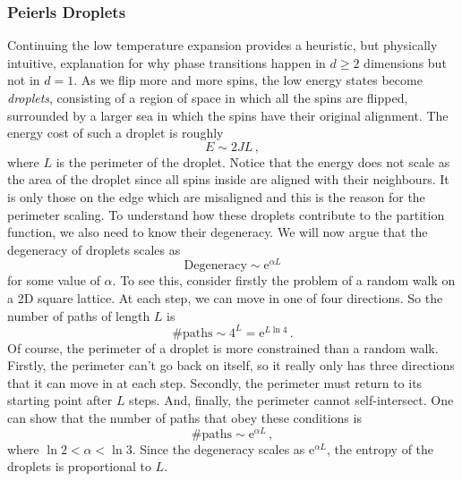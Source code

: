 \documentclass{article}
\theoremstyle{plain}\theoremheaderfont{\normalfont\bfseries}\theorembodyfont{\rmfamily}\theoremseparator{.}\newtheorem*{thm}{Theorem}\newtheorem*{law}{Law}\newtheorem*{pos}{Postulate}
\numberwithin{equation}{section}
\newcommand{\ee}{\mathrm{e}}
\begin{document}
    \subsubsection*{Peierls Droplets}
    Continuing the low temperature expansion provides a heuristic, but physically intuitive, explanation for why phase transitions happen in \(d\ge 2\) dimensions but not in \(d=1\). As we flip more and more spins, the low energy states become \textit{droplets}, consisting of a region of space in which all the spins are flipped, surrounded by a larger sea in which the spins have their original alignment. The energy cost of such a droplet is roughly
    \begin{equation}
        E\sim 2JL\,,
    \end{equation}
    where \(L\) is the perimeter of the droplet. Notice that the energy does not scale as the area of the droplet since all spins inside are aligned with their neighbours. It is only those on the edge which are misaligned and this is the reason for the perimeter scaling. To understand how these droplets contribute to the partition function, we also need to know their degeneracy. We will now argue that the degeneracy of droplets scales as
    \begin{equation}
        \text{Degeneracy}\sim \ee^{\alpha L}
    \end{equation}
    for some value of \(\alpha\). To see this, consider firstly the problem of a random walk on a 2D square lattice. At each step, we can move in one of four directions. So the number of paths of length \(L\) is
    \begin{equation}
        \#\text{paths}\sim 4^L=\ee^{L\ln 4}\,.
    \end{equation}
    Of course, the perimeter of a droplet is more constrained than a random walk. Firstly, the perimeter can't go back on itself, so it really only has three directions that it can move in at each step. Secondly, the perimeter must return to its starting point after \(L\) steps. And, finally, the perimeter cannot self-intersect. One can show that the number of paths that obey these conditions is
    \begin{equation}
        \#\text{paths}\sim \ee^{\alpha L}\,,
    \end{equation}
    where \(\ln 2<\alpha<\ln 3\). Since the degeneracy scales as \(\ee^{\alpha L}\), the entropy of the droplets is proportional to \(L\).
\end{document}
